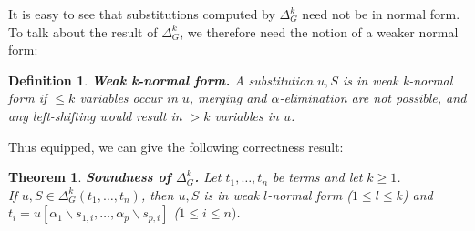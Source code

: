 \documentclass[a4paper, 11pt]{report}
\newtheorem{theorem}{Theorem}
\newtheorem{definition}{Definition}
\begin{document}
It is easy to see that substitutions computed by $\Delta_G^k$ need not be in normal form. To talk about the result of $\Delta_G^k$, we therefore need the notion of a weaker normal form:

\begin{definition}
\textbf{Weak k-normal form.}
A substitution $u,S$ is in weak k-normal form if $\leq k$ variables occur in $u$, merging and $\alpha$-elimination are not possible, and any left-shifting would result in $> k$ variables in $u$.
\end{definition}

\noindent
Thus equipped, we can give the following correctness result:



\begin{theorem}
\textbf{Soundness of $\Delta_G^k$.}
Let $t_1,\dots,t_n$ be terms and let $k\geq 1$.\\
If $u,S \in \Delta_G^k(t_1,\dots,t_n)$, then $u,S$ is in weak $l$-normal form ($1 \leq l \leq k$) and $t_i = u[\alpha_1\backslash s_{1,i},\dots,\alpha_p\backslash s_{p,i}]$ ($1\leq i \leq n)$.
\label{thm:DeltaGkSoundness}
\end{theorem}
\end{document}
